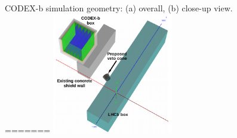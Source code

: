 
\begin{figure}
\centering
{}
\caption{
    CODEX-b simulation geometry: (a) overall, (b) close-up view. 
=======
    \includegraphics[width=0.47\textwidth]{figs/INT/CODEXbBigGeo.pdf} 
}
\end{figure}
